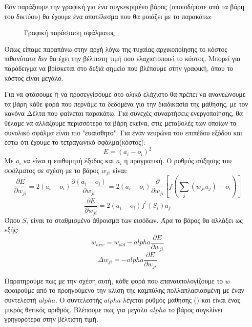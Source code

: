 Εάν παράξουμε την γραφική  για ένα συγκεκριμένο βάρος (οποιοδήποτε από
τα βάρη του δικτύου) θα έχουμε ένα αποτέλεσμα που θα μοιάζει με το παρακάτω:
\begin{figure}[H]
    \centering
    \caption{Γραφική παράσταση σφάλματος}
\end{figure}

Όπως είπαμε παραπάνω στην αρχή λόγω της τυχαίας αρχικοποίησης το κόστος πιθανότατα
δεν θα έχει την βέλτιστη τιμή που ελαχιστοποιεί το κόστος. Μπορεί για παράδειγμα να
βρίσκεται στο δεξιά σημείο που βλέπουμε στην γραφική, όπου το κόστος είναι μεγάλο.

Για
να φτάσουμε ή να προσεγγίσουμε στο ολικό ελάχιστο θα πρέπει να ανανεώνουμε τα βάρη
κάθε φορά που περνάμε τα δεδομένα για την διαδικασία της μάθησης, με τον κανόνα Δέλτα
που φαίνεται παρακάτω. Για συνεχές συναρτήσεις ενεργοποίησης, θα θέλαμε να αλλάξουμε
περισσότερο τα βάρη εκείνα, στις μεταβολές των οποίων το συνολικό σφάλμα είναι πιο
"ευαίσθητο". Για έναν νευρώνα του επιπέδου εξόδου και έστω ότι έχουμε το τετραγωνικό
σφάλμα(κόστος):
$$E=(a_i-o_i)^2$$
Με $o_i$ να είναι η επιθυμητή έξοδος και $a_i$ η πραγματική.
Ο ρυθμός αύξησης του σφάλματος σε σχέση με το βάρος $w_{ji}$ είναι:
$$\frac{\partial E}{\partial w_{ji}}=2(a_i-o_i)\frac{\partial (a_i-o_i)}{\partial w_{ji}}=2(a_i-o_i)\frac{\partial}{\partial w_{ji}}\left[ f\left( \sum\limits_j(w_{ji}a_j)-o_i\right)\right]$$
$$\frac{\partial E}{\partial w_{ji}}=2(a_i-o_i)f^\prime (S_i)a_j$$
Όπου $S_i$ είναι το σταθμισμένο άθροισμα των εισόδων.
Άρα το βάρος θα αλλάξει ως εξής:
$$w_{new}=w_{old}-alpha\frac{\partial E}{\partial w_{ji}}$$
$$\Delta w_{ji}=-alpha\frac{\partial E}{\partial w_{ji}}$$

Παρατηρούμε πως με την σχέση αυτή, κάθε φορά που επαναυπολογίζουμε το $w$ αφαιρούμε
από το προηγούμενο την κλίση της καμπύλης πολλαπλασιασμένη με έναν συντελεστή $alpha$.
Ο συντελεστής $alpha$ λέγεται ρυθμός μάθησης () και είναι ένας μικρός θετικός
αριθμός. Βλέπουμε πως για μεγάλο $alpha$ το βάρος συγκλίνει γρηγορότερα στην βέλτιστη
τιμή.

